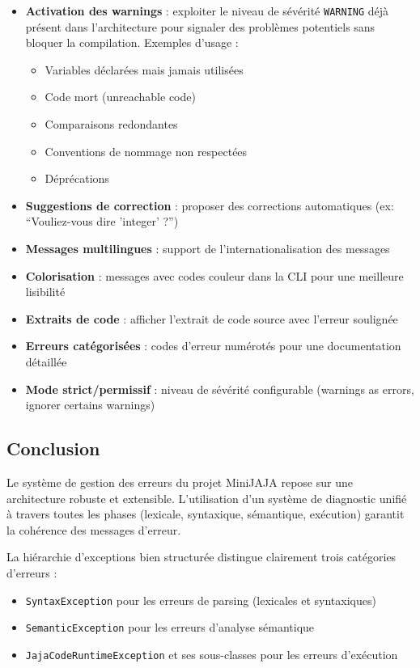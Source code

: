 \begin{itemize}
    \item \textbf{Activation des warnings} : exploiter le niveau de sévérité \texttt{WARNING} déjà présent dans l'architecture pour signaler des problèmes potentiels sans bloquer la compilation. Exemples d'usage :
    \begin{itemize}
        \item Variables déclarées mais jamais utilisées
        \item Code mort (unreachable code)
        \item Comparaisons redondantes
        \item Conventions de nommage non respectées
        \item Déprécations
    \end{itemize}
    \item \textbf{Suggestions de correction} : proposer des corrections automatiques (ex: ``Vouliez-vous dire 'integer' ?'')
    \item \textbf{Messages multilingues} : support de l'internationalisation des messages
    \item \textbf{Colorisation} : messages avec codes couleur dans la CLI pour une meilleure lisibilité
    \item \textbf{Extraits de code} : afficher l'extrait de code source avec l'erreur soulignée
    \item \textbf{Erreurs catégorisées} : codes d'erreur numérotés pour une documentation détaillée
    \item \textbf{Mode strict/permissif} : niveau de sévérité configurable (warnings as errors, ignorer certains warnings)
\end{itemize}

\subsection{Conclusion}\label{subsec:conclusion}

Le système de gestion des erreurs du projet MiniJAJA repose sur une architecture robuste et extensible.
L'utilisation d'un système de diagnostic unifié à travers toutes les phases (lexicale, syntaxique, sémantique, exécution) garantit la cohérence des messages d'erreur.

La hiérarchie d'exceptions bien structurée distingue clairement trois catégories d'erreurs :
\begin{itemize}
    \item \texttt{SyntaxException} pour les erreurs de parsing (lexicales et syntaxiques)
    \item \texttt{SemanticException} pour les erreurs d'analyse sémantique
    \item \texttt{JajaCodeRuntimeException} et ses sous-classes pour les erreurs d'exécution
\end{itemize}

